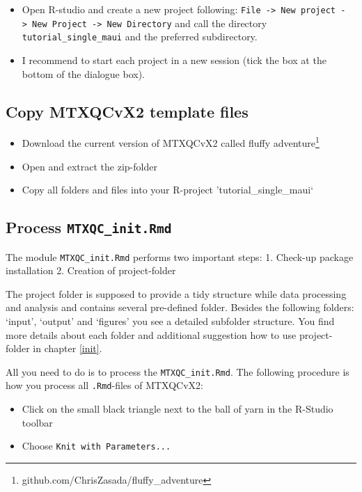 \documentclass[]{book}
\providecommand{\tightlist}{%
  \setlength{\itemsep}{0pt}\setlength{\parskip}{0pt}}
\let\rmarkdownfootnote\footnote%
\def\footnote{\protect\rmarkdownfootnote}
\begin{document}
\begin{itemize}
\tightlist
\item
  Open R-studio and create a new project following: \texttt{File\ -\textgreater{}\ New\ project\ -\textgreater{}\ New\ Project\ -\textgreater{}\ New\ Directory} and call the directory \texttt{tutorial\_single\_maui} and the preferred subdirectory.
\item
  I recommend to start each project in a new session (tick the box at the bottom of the dialogue box).
\end{itemize}

\hypertarget{copy-mtxqcvx2-template-files}{%
\subsection{Copy MTXQCvX2 template files}\label{copy-mtxqcvx2-template-files}}

\begin{itemize}
\tightlist
\item
  Download the current version of MTXQCvX2 called fluffy adventure\footnote{github.com/ChrisZasada/fluffy\_adventure}
\item
  Open and extract the zip-folder
\item
  Copy all folders and files into your R-project 'tutorial\_single\_maui`
\end{itemize}

\hypertarget{process-mtxqc_init.rmd}{%
\subsection{\texorpdfstring{Process \texttt{MTXQC\_init.Rmd}}{Process MTXQC\_init.Rmd}}\label{process-mtxqc_init.rmd}}

The module \texttt{MTXQC\_init.Rmd} performs two important steps:
1. Check-up package installation
2. Creation of project-folder

The project folder is supposed to provide a tidy structure while data processing and analysis and contains several pre-defined folder. Besides the following folders: `input', `output' and `figures' you see a detailed subfolder structure. You find more details about each folder and additional suggestion how to use project-folder in chapter \ref{init}.

All you need to do is to process the \texttt{MTXQC\_init.Rmd}. The following procedure is how you process all \texttt{.Rmd}-files of MTXQCvX2:

\begin{itemize}
\tightlist
\item
  Click on the small black triangle next to the ball of yarn in the R-Studio toolbar
\item
  Choose \texttt{Knit\ with\ Parameters...}
\end{itemize}
\end{document}
